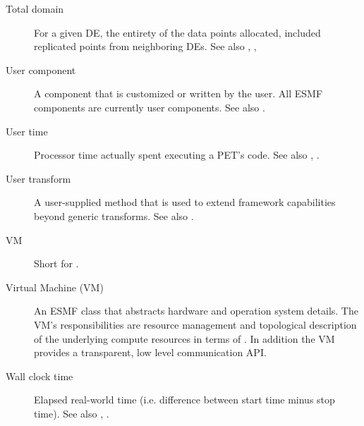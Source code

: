 \begin{description}
\item[Total domain] \label{glos:TotDomain} For a given DE, the entirety 
  of the data points allocated, included replicated points from neighboring
  DEs.  See also , 
  , 

\item[User component] \label{glos:UserComp} A component that is customized or
  written by the user.  All ESMF components are currently user components.
  See also .

\item[User time] \label{glos:UserTime} Processor time actually spent executing 
  a PET's code. See also , 
  .

\item[User transform] \label{glos:UserTrans} A user-supplied 
  method that is used to extend framework capabilities beyond generic 
  transforms. See also . 

\item[VM] \label{glos:VM} Short for 
  .

\item[Virtual Machine (VM)] \label{glos:VMachine} An ESMF class that 
  abstracts hardware and 
  operation system details. The VM's responsibilities are resource management
  and topological description of the underlying compute resources in terms of 
  . In addition the VM provides a transparent, low level
  communication API. 

\item [Wall clock time] \label{WallClockTime} Elapsed real-world time 
  (i.e. difference between start time minus stop time).
  See also , .

\end{description}








































